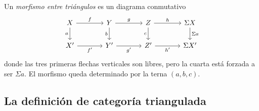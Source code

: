 \begin{defi}
Un \emph{morfismo entre triángulos} es un diagrama conmutativo
\[
\begin{tikzcd}[column sep=large]
X \arrow[r,"f"] \arrow[d,"a"'] & Y \arrow[r,"g"] \arrow[d,"b"'] & Z \arrow[r,"h"] \arrow[d,"c"'] & \Sigma X \arrow[d,"\Sigma a"]\\
X' \arrow[r,"f'"'] & Y' \arrow[r,"g'"'] & Z' \arrow[r,"h'"'] & \Sigma X'
\end{tikzcd}
\]
donde las tres primeras flechas verticales son libres, pero la cuarta está forzada a ser $\Sigma a$. El morfismo queda determinado por la terna $(a,b,c)$.
\end{defi}

\subsection{La definición de categoría triangulada}

